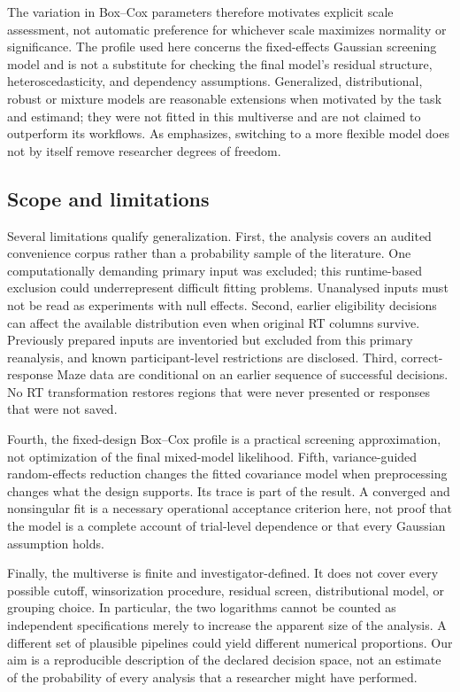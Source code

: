 The variation in Box--Cox parameters therefore motivates explicit scale
assessment, not automatic preference for whichever scale maximizes
normality or significance. The profile used here concerns the fixed-effects
Gaussian screening model and is not a substitute for checking the final
model's residual structure, heteroscedasticity, and dependency assumptions.
Generalized, distributional, robust or mixture models are reasonable
extensions when motivated by the task and estimand; they were not fitted
in this multiverse and are not claimed to outperform its workflows.
As \citet{vankov_hazards_2023} emphasizes, switching to a more flexible model
does not by itself remove researcher degrees of freedom.

\subsection{Scope and limitations}

Several limitations qualify generalization. First, the analysis covers an
audited convenience corpus rather than a probability sample of the literature.
One computationally demanding primary input was excluded; this runtime-based
exclusion could underrepresent difficult fitting problems. Unanalysed inputs
must not be read as experiments with null effects. Second, earlier eligibility
decisions can affect the available distribution even when original RT columns
survive. Previously prepared inputs are inventoried but excluded from this
primary reanalysis, and known participant-level restrictions are disclosed. Third,
correct-response Maze data are conditional on an earlier sequence of
successful decisions. No RT transformation restores regions that were
never presented or responses that were not saved.

Fourth, the fixed-design Box--Cox profile is a practical screening
approximation, not optimization of the final mixed-model likelihood.
Fifth, variance-guided random-effects reduction changes the fitted
covariance model when preprocessing changes what the design supports.
Its trace is part of the result. A converged and nonsingular fit is a
necessary operational acceptance criterion here, not proof that the
model is a complete account of trial-level dependence or that every
Gaussian assumption holds.

Finally, the multiverse is finite and investigator-defined. It does not
cover every possible cutoff, winsorization procedure, residual screen,
distributional model, or grouping choice. In particular, the two
logarithms cannot be counted as independent specifications merely to
increase the apparent size of the analysis. A different set of plausible
pipelines could yield different numerical proportions. Our aim is a
reproducible description of the declared decision space, not an estimate of
the probability of every analysis that a researcher might have performed.

